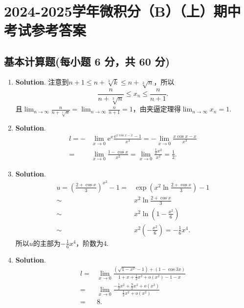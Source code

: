\documentclass[../main.tex]{subfiles}
\begin{document}
\chapter{2024-2025学年微积分（B）（上）期中考试参考答案}
\section{基本计算题(每小题 6 分，共 60 分)}
\begin{enumerate}
    \item \textbf{Solution}. 注意到$n+1\leq n+\sqrt[3]{k}\leq n+\sqrt[3]{n}$，所以
          \[
              \frac{n}{n+\sqrt[3]{n}}\leq x_{n}\leq \frac{n}{n+1}.
          \]
          且$\lim_{n\to\infty}\frac{n}{n+\sqrt[3]{n}}=\lim_{n\to\infty}\frac{n}{n+1}=
              1$，由夹逼定理得$\lim_{n\to\infty}x_{n}=1$.

    \item \textbf{Solution}.
          \[
              \begin{aligned}
                  l=-  & \lim_{x\to 0}\mathrm{e}^{x}\frac{\mathrm{e}^{x\cos x-x}-1}{x^3}=-\lim_{x\to0}\frac{x\cos x-x}{x^3} \\
                  = {} & \lim_{x\to0}\frac{1-\cos x}{x^2}=\lim_{x\to0}\frac{\frac{1}{2}x^2}{x^2}=\frac{1}{2}.
              \end{aligned}
          \]

    \item \textbf{Solution}.
          \[
              \begin{aligned}
                  u=\left(\frac{2+\cos x}{3}\right)^{x^2}-1= {} & \exp\left({x^2\ln\frac{2+\cos x}{3}}\right)-1       \\
                  \sim  {}                                      & x^{2}\ln\frac{2+\cos x}{3}                          \\
                  \sim  {}                                      & x^{2}\ln\left(1-\frac{x^2}{6}\right)                \\
                  \sim  {}                                      & x^{2}\left(-\frac{x^2}{6}\right)=-\frac{1}{6}x^{4}.
              \end{aligned}
          \]
          所以$u$的主部为$-\frac{1}{6}x^{4}$，阶数为4.

    \item \textbf{Solution}.
          \[
              \begin{aligned}
                  l= {} & \lim_{x\to0}\frac{(\sqrt{1-x^2}-1)+(1-\cos 3x)}{1+x+\frac{1}{2}x^2+o(x^2)-1-x}  \\
                  = {}  & \lim_{x\to0}\frac{-\frac{1}{2}x^2+\frac{9}{2}x^2+o(x^2)}{\frac{1}{2}x^2+o(x^2)} \\
                  = {}  & 8.
              \end{aligned}
          \]


\end{enumerate}
\end{document}
